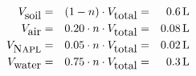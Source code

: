 \documentclass{homework}
\begin{document}
\begin{homeworkProblem}
\begin{homeworkSection}{}
\begin{align}
\label{eqn:volBreakdown}
V_{\mbox{soil}} & = & (1-n)\cdot V_{\mbox{total}} & = & \SI{0.6}{\liter} \nonumber\\
V_{\mbox{air}} & = & 0.20\cdot n\cdot V_{\mbox{total}} & = & \SI{0.08}{\liter} \nonumber\\
V_{\mbox{{\scshape Napl}}} & = & 0.05\cdot n\cdot V_{\mbox{total}} & = & \SI{0.02}{\liter} \nonumber\\
V_{\mbox{water}} & = & 0.75\cdot n\cdot V_{\mbox{total}} & = & \SI{0.3}{\liter}
\end{align}

\end{homeworkSection}


\end{homeworkProblem}


\end{document}
